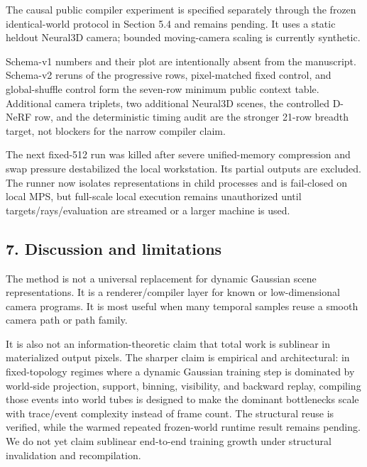 \documentclass[
]{article}
\begin{document}
\begin{table}[t]
\centering
\caption{Public representation and cost context under the declared schema-v2 controls.}
\label{tab:public-context}

\end{table}

The causal public compiler experiment is specified separately through
the frozen identical-world protocol in Section 5.4 and remains pending.
It uses a static heldout Neural3D camera; bounded moving-camera scaling
is currently synthetic.

Schema-v1 numbers and their plot are intentionally absent from the
manuscript. Schema-v2 reruns of the progressive rows, pixel-matched
fixed control, and global-shuffle control form the seven-row minimum
public context table. Additional camera triplets, two additional
Neural3D scenes, the controlled D-NeRF row, and the deterministic timing
audit are the stronger 21-row breadth target, not blockers for the
narrow compiler claim.

The next fixed-512 run was killed after severe unified-memory
compression and swap pressure destabilized the local workstation. Its
partial outputs are excluded. The runner now isolates representations in
child processes and is fail-closed on local MPS, but full-scale local
execution remains unauthorized until targets/rays/evaluation are
streamed or a larger machine is used.

\subsection{7. Discussion and
limitations}\label{discussion-and-limitations}

The method is not a universal replacement for dynamic Gaussian scene
representations. It is a renderer/compiler layer for known or
low-dimensional camera programs. It is most useful when many temporal
samples reuse a smooth camera path or path family.

It is also not an information-theoretic claim that total work is
sublinear in materialized output pixels. The sharper claim is empirical
and architectural: in fixed-topology regimes where a dynamic Gaussian
training step is dominated by world-side projection, support, binning,
visibility, and backward replay, compiling those events into world tubes
is designed to make the dominant bottlenecks scale with trace/event
complexity instead of frame count. The structural reuse is verified,
while the warmed repeated frozen-world runtime result remains pending.
We do not yet claim sublinear end-to-end training growth under
structural invalidation and recompilation.
\end{document}
